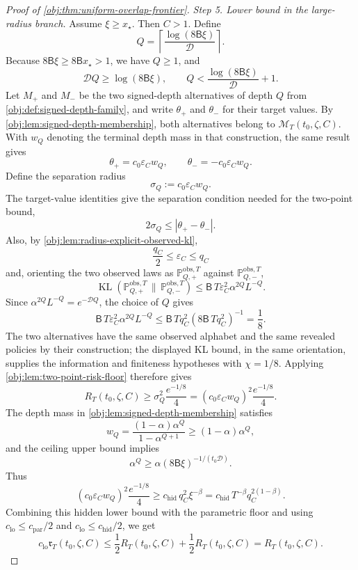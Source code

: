 \begin{proof}[Proof of \cref{obj:thm:uniform-overlap-frontier}]
\emph{Step 5. Lower bound in the large-radius branch.}
Assume \(\xi\ge x_\star\). Then \(C>1\). Define
\[
Q=\left\lceil\frac{\log(8\mathsf B\xi)}{\mathcal D}\right\rceil .
\]
Because \(8\mathsf B\xi\ge8\mathsf Bx_\star>1\), we have \(Q\ge1\), and
\[
\mathcal D Q\ge \log(8\mathsf B\xi),
\qquad
Q<\frac{\log(8\mathsf B\xi)}{\mathcal D}+1 .
\]
Let \(M_+\) and \(M_-\) be the two signed-depth alternatives of depth \(Q\) from
\cref{obj:def:signed-depth-family}, and write \(\theta_+\) and \(\theta_-\) for
their target values.  By \cref{obj:lem:signed-depth-membership}, both alternatives
belong to \(\mathcal M_T(t_0,\zeta,C)\).  With \(w_Q\) denoting the terminal
depth mass in that construction, the same result gives
\[
\theta_+=c_0\varepsilon_C w_Q,
\qquad
\theta_-=-c_0\varepsilon_C w_Q.
\]
Define the separation radius
\[
\sigma_Q:=c_0\varepsilon_C w_Q .
\]
The target-value identities give the separation condition needed for the two-point
bound,
\[
2\sigma_Q\le |\theta_+-\theta_-| .
\]
Also, by \cref{obj:lem:radius-explicit-observed-kl},
\[
\frac{q_C}{2}\le\varepsilon_C\le q_C
\]
and, orienting the two observed laws as \(\mathbb P_{Q,+}^{\mathrm{obs},T}\)
against \(\mathbb P_{Q,-}^{\mathrm{obs},T}\),
\[
\operatorname{KL}(\mathbb P_{Q,+}^{\mathrm{obs},T}\,\|\,\mathbb P_{Q,-}^{\mathrm{obs},T})
\le
\mathsf B\,T\varepsilon_C^2\alpha^{2Q}L^{-Q}.
\]
Since \(\alpha^{2Q}L^{-Q}=e^{-\mathcal DQ}\), the choice of \(Q\) gives
\[
\mathsf B\,T\varepsilon_C^2\alpha^{2Q}L^{-Q}
\le
\mathsf B\,Tq_C^2(8\mathsf B\,Tq_C^2)^{-1}
=
\frac18 .
\]
The two alternatives have the same observed alphabet and the same revealed policies
by their construction; the displayed KL bound, in the same orientation, supplies
the information and finiteness hypotheses with \(\chi=1/8\).  Applying
\cref{obj:lem:two-point-risk-floor} therefore gives
\[
R_T(t_0,\zeta,C)
\ge
\sigma_Q^2\frac{e^{-1/8}}4
=
(c_0\varepsilon_Cw_Q)^2\frac{e^{-1/8}}4 .
\]
The depth mass in \cref{obj:lem:signed-depth-membership} satisfies
\[
w_Q=\frac{(1-\alpha)\alpha^Q}{1-\alpha^{Q+1}}
\ge
(1-\alpha)\alpha^Q,
\]
and the ceiling upper bound implies
\[
\alpha^Q
\ge
\alpha(8\mathsf B\xi)^{-1/(t_0\mathcal D)}.
\]
Thus
\[
(c_0\varepsilon_Cw_Q)^2\frac{e^{-1/8}}4
\ge
c_{\mathrm{hid}}\,q_C^2\xi^{-\beta}
=
c_{\mathrm{hid}}\,T^{-\beta}q_C^{2(1-\beta)}.
\]
Combining this hidden lower bound with the parametric floor and using
\(c_{\mathrm{lo}}\le c_{\mathrm{par}}/2\) and
\(c_{\mathrm{lo}}\le c_{\mathrm{hid}}/2\), we get
\[
c_{\mathrm{lo}}\mathfrak r_T(t_0,\zeta,C)
\le
\frac12 R_T(t_0,\zeta,C)+\frac12 R_T(t_0,\zeta,C)
=
R_T(t_0,\zeta,C).
\] %


\end{proof}
